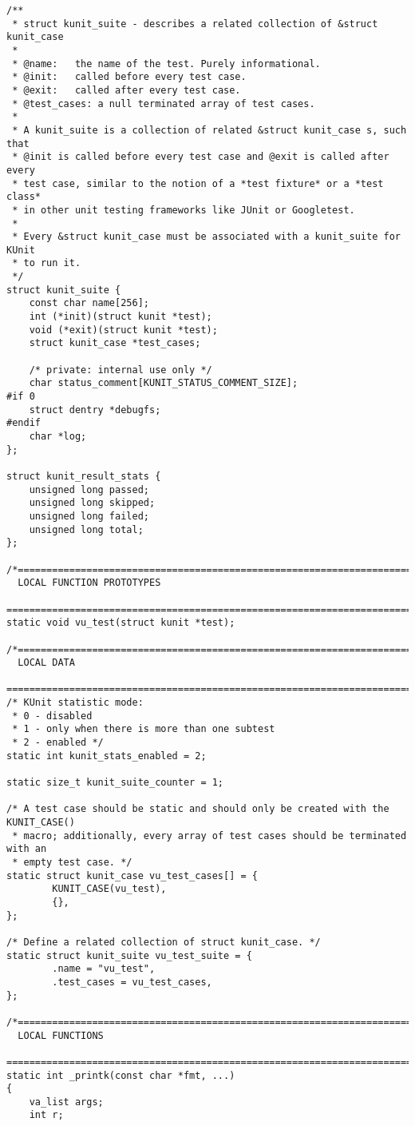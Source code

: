 \documentclass{article}
\begin{document}
\begin{lstlisting}[style=CStyle]
/**
 * struct kunit_suite - describes a related collection of &struct kunit_case
 *
 * @name:	the name of the test. Purely informational.
 * @init:	called before every test case.
 * @exit:	called after every test case.
 * @test_cases:	a null terminated array of test cases.
 *
 * A kunit_suite is a collection of related &struct kunit_case s, such that
 * @init is called before every test case and @exit is called after every
 * test case, similar to the notion of a *test fixture* or a *test class*
 * in other unit testing frameworks like JUnit or Googletest.
 *
 * Every &struct kunit_case must be associated with a kunit_suite for KUnit
 * to run it.
 */
struct kunit_suite {
	const char name[256];
	int (*init)(struct kunit *test);
	void (*exit)(struct kunit *test);
	struct kunit_case *test_cases;

	/* private: internal use only */
	char status_comment[KUNIT_STATUS_COMMENT_SIZE];
#if 0
	struct dentry *debugfs;
#endif
	char *log;
};

struct kunit_result_stats {
	unsigned long passed;
	unsigned long skipped;
	unsigned long failed;
	unsigned long total;
};

/*============================================================================
  LOCAL FUNCTION PROTOTYPES
  ============================================================================*/
static void vu_test(struct kunit *test);

/*============================================================================
  LOCAL DATA
  ============================================================================*/
/* KUnit statistic mode:
 * 0 - disabled
 * 1 - only when there is more than one subtest
 * 2 - enabled */
static int kunit_stats_enabled = 2;

static size_t kunit_suite_counter = 1;

/* A test case should be static and should only be created with the KUNIT_CASE()
 * macro; additionally, every array of test cases should be terminated with an
 * empty test case. */
static struct kunit_case vu_test_cases[] = {
        KUNIT_CASE(vu_test),
        {},
};

/* Define a related collection of struct kunit_case. */
static struct kunit_suite vu_test_suite = {
        .name = "vu_test",
        .test_cases = vu_test_cases,
};

/*============================================================================
  LOCAL FUNCTIONS
  ============================================================================*/
static int _printk(const char *fmt, ...)
{
	va_list args;
	int r;


\end{lstlisting}
\end{document}
